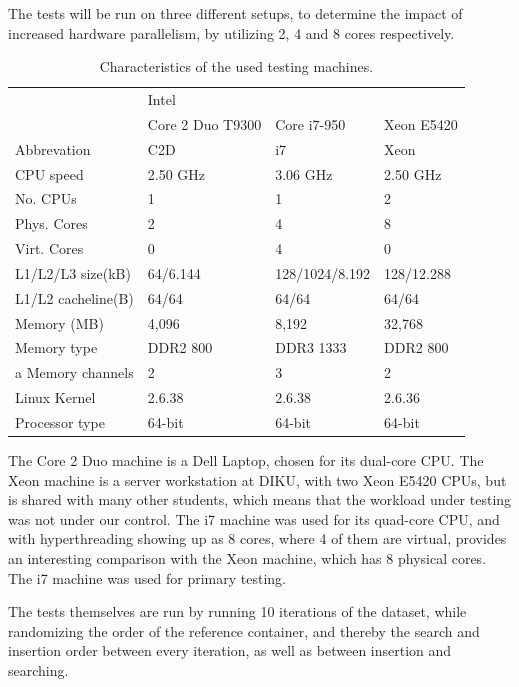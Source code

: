The tests will be run on three different setups, to determine the impact of
increased hardware parallelism, by utilizing 2, 4 and 8 cores respectively.

\begin{table}[h!]
    \centering
    \begin{tabular}[here]{ l l l l }
        \hline
                  & Intel \\\cline{2-4}
                  & Core 2 Duo T9300 & Core i7-950  & Xeon E5420 \\ \hline
        Abbrevation & C2D & i7 & Xeon \\ 
        CPU speed   & 2.50 GHz & 3.06 GHz & 2.50 GHz \\
        No. CPUs    & 1 & 1 & 2 \\
        Phys. Cores & 2 & 4 & 8 \\
        Virt. Cores & 0 & 4 & 0 \\
        L1/L2/L3 size(kB) & 64/6.144 & 128/1024/8.192 & 128/12.288\\
        L1/L2 cacheline(B) & 64/64 & 64/64 & 64/64\\
        Memory (MB) & 4,096 & 8,192 & 32,768 \\
        Memory type & DDR2 800 & DDR3 1333 & DDR2 800 \\a
        Memory channels & 2 & 3 & 2 \\
        Linux Kernel    & 2.6.38 & 2.6.38 & 2.6.36 \\
        Processor type  & 64-bit & 64-bit & 64-bit \\\hline
    \end{tabular}
    \caption{Characteristics of the used testing machines.}
    \label{tab:cpucpecs}
\end{table}

The Core 2 Duo machine is a Dell Laptop, chosen for its dual-core CPU.
The Xeon machine is a server workstation at DIKU, with two Xeon E5420 CPUs,
but is shared with many other students, which means that the workload
under testing was not under our control. The i7 machine was used for its
quad-core CPU, and with hyperthreading showing up as 8 cores, where 4 of them
are virtual, provides an interesting comparison with the Xeon machine, which
has 8 physical cores. The i7 machine was used for primary testing.

The tests themselves are run by running 10 iterations of the dataset, while randomizing
the order of the reference container, and thereby the search and insertion order
between every iteration, as well as between insertion and searching.


